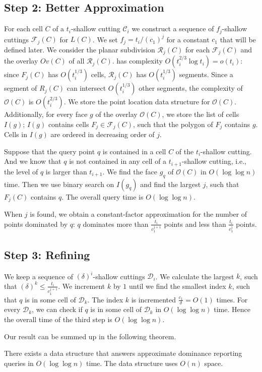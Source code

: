 \documentclass[anonymous,a4paper,USenglish,cleveref,autoref,thm-restate] {socg-lipics-v2021}
\newcommand{\cF}{\mathcal{F}}
\newcommand{\cD}{\mathcal{D}}
\newcommand{\cO}{\mathcal{O}}
\newcommand{\cC}{\mathcal{C}}
\newcommand{\cR}{\mathcal{R}}
\newcommand{\Ov}{\cO}
\begin{document}
\subsection{Step 2: Better Approximation}
\label{sec:step2}
For each cell $C$ of a $t_i$-shallow cutting $\cC_i$ we construct a sequence of $f_j$-shallow cuttings $\cF_j(C)$ for $L(C)$. We set  $f_j=t_i/(c_1)^j$ for a constant $c_1$ that will be defined later.  We consider the planar subdivision $\cR_j(C)$ for each $\cF_j(C)$ and the overlay $Ov(C)$ of all $\cR_j(C)$.  has complexity $O(t_i^{2/3}\log t_i)=o(t_i)$: since $F_j(C)$ has $O(t_i^{1/3})$ cells, $\cR_j(C)$ has $O(t_i^{1/3})$ segments. Since a segment of $R_j(C)$ can intersect $O(t_i^{1/3})$ other segments, the complexity of $\Ov(C)$ is $O(t_i^{2/3})$. We store the point location data structure for $\Ov(C)$.  Additionally, for every face $g$  of the overlay $\Ov(C)$, we store the list of cells $I(g)$; $I(g)$ contains cells $F_j\in \cF_j(C)$, such that the polygon of $F_j$ contains $g$. Cells in $I(g)$ are ordered in decreasing order of $j$. 


Suppose that the query point $q$ is contained in a cell $C$ of the $t_i$-shallow cutting.  And we know that $q$ is not contained in any cell of a $t_{i+1}$-shallow cutting, i.e., the level of $q$ is larger than $t_{i+1}$. We find the face $g_q$ of $\Ov(C)$ in $O(\log\log n)$ time. Then we use binary search on $I(g_q)$ and find the largest $j$, such that $F_j(C)$ contains $q$.  The overall query time is $O(\log\log n)$.

When $j$ is found, we obtain a constant-factor approximation for the number of points dominated by $q$: $q$ dominates more than $\frac{t_i}{c_1^{j+1}}$ points and less than $\frac{t_i}{c_1^j}$ points.  

\subsection{Step 3: Refining}
\label{sec:step3}
We keep a sequence of $(\delta)^i$-shallow cuttings $\cD_i$. We calculate the largest $k$, such that $(\delta)^k\leq \frac{t_i}{c_1^{j+1}}$. We increment $k$ by $1$ until we find the smallest index $k$, such that $q$ is in some cell of $\cD_k$. The index $k$ is incremented $\frac{c_1}{\delta}=O(1)$ times. For every $\cD_k$, we can check if $q$ is in some cell of $\cD_k$ in $O(\log\log n)$ time. Hence the overall time of the third step is $O(\log \log n)$.

Our result can be summed up in the following theorem.
\begin{theorem}
  \label{theor:domin-approx}
 There exists a data structure that answers approximate dominance reporting queries in $O(\log \log n)$ time. The data structure uses $O(n)$ space.
\end{theorem}
\end{document}
